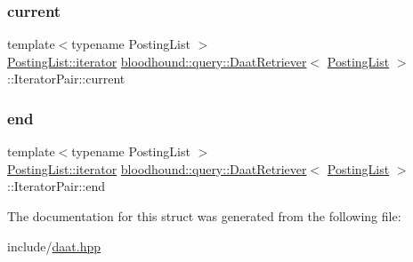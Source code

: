 \subsubsection{\texorpdfstring{current}{current}}
{\footnotesize\ttfamily template$<$typename Posting\+List $>$ \\
\hyperlink{structbloodhound_1_1PostingList_1_1iterator}{Posting\+List\+::iterator} \hyperlink{classbloodhound_1_1query_1_1DaatRetriever}{bloodhound\+::query\+::\+Daat\+Retriever}$<$ \hyperlink{classbloodhound_1_1PostingList}{Posting\+List} $>$\+::Iterator\+Pair\+::current}

\mbox{\label{structbloodhound_1_1query_1_1DaatRetriever_1_1IteratorPair_af2205effb4b97e6351c3d32c034342c2}} 
\subsubsection{\texorpdfstring{end}{end}}
{\footnotesize\ttfamily template$<$typename Posting\+List $>$ \\
\hyperlink{structbloodhound_1_1PostingList_1_1iterator}{Posting\+List\+::iterator} \hyperlink{classbloodhound_1_1query_1_1DaatRetriever}{bloodhound\+::query\+::\+Daat\+Retriever}$<$ \hyperlink{classbloodhound_1_1PostingList}{Posting\+List} $>$\+::Iterator\+Pair\+::end}



The documentation for this struct was generated from the following file\+:\begin{DoxyCompactItemize}
\item 
include/\hyperlink{daat_8hpp}{daat.\+hpp}\end{DoxyCompactItemize}
